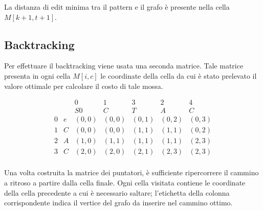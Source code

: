 \documentclass[11pt, a4paper]{article}
\begin{document}
La distanza di edit minima tra il pattern e il grafo è presente nella
cella $M[k+1,t+1]$.


\subsection{Backtracking}
Per effettuare il backtracking viene usata una seconda matrice.
Tale matrice presenta in ogni cella $M[i,c]$ le coordinate della cella da cui è stato prelevato il valore ottimale per calcolare il costo di tale mossa.

\begin{table}[H]
    \centering
    \[
    \begin{array}{cc|ccccc}
        &   & 0  & 1 & 3 & 2 & 4 \\
        &   & S0 & C & T & A & C \\
    \hline
    0 & e & (0,0) & (0,0) & (0,1) & (0,2) & (0,3) \\
    1 & C & (0,0) & (0,0) & (1,1) & (1,1) & (0,2) \\
    2 & A & (1,0) & (1,1) & (1,1) & (1,1) & (2,3) \\
    3 & C & (2,0) & (2,0) & (2,1) & (2,3) & (2,3) \\
    \end{array}
    \]
    \caption{Matrice di backtracking completa}
    \label{tab:matrice-backtracking-completa}
\end{table}
Una volta costruita la matrice dei puntatori, è sufficiente ripercorrere il cammino a ritroso a partire dalla cella finale. Ogni cella visitata contiene le coordinate della cella precedente a cui è necessario saltare; l'etichetta della colonna corrispondente indica il vertice del grafo da inserire nel cammino ottimo.
\end{document}
